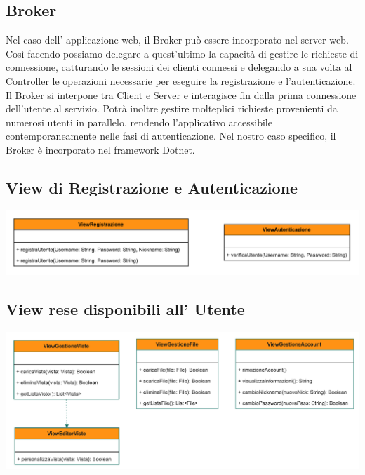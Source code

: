 \pagebreak
\subsection*{Broker}
{}
Nel caso dell' applicazione web, il Broker può essere incorporato nel server web.
\\Così facendo possiamo delegare a quest'ultimo la capacità di gestire le richieste di connessione, catturando le sessioni dei clienti connessi e delegando a sua volta al Controller le operazioni necessarie per eseguire la registrazione e l'autenticazione.\\
Il Broker si interpone tra Client e Server e interagisce fin dalla prima connessione dell'utente al servizio. Potrà inoltre gestire molteplici richieste provenienti da numerosi utenti in parallelo, rendendo l'applicativo accessibile contemporaneamente nelle fasi di autenticazione.
Nel nostro caso specifico, il Broker è incorporato nel framework Dotnet. 
\vspace{0.5cm}



\subsection*{View di Registrazione e Autenticazione}
{}
\begin{adjustwidth}{-2cm}{0cm}
\includegraphics[scale=0.8]{progettazione/Progettazione-Interfacce Disponibili Registrazione_Autenticazione.drawio.pdf}
\end{adjustwidth}
\vspace{0.5cm}
\vspace{0.5cm}




\subsection*{View rese disponibili all' Utente}
{}
\begin{adjustwidth}{-2cm}{0cm}
\includegraphics[scale=0.9]{progettazione/Progettazione-Interfacce Disponibili all' Utente.drawio.pdf}
\end{adjustwidth}
\vspace{0.5cm}
\vspace{0.5cm}


